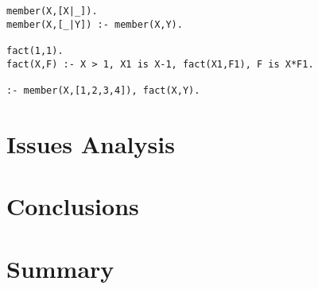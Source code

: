 
\begin{verbatim}
member(X,[X|_]).
member(X,[_|Y]) :- member(X,Y).

fact(1,1).
fact(X,F) :- X > 1, X1 is X-1, fact(X1,F1), F is X*F1.

:- member(X,[1,2,3,4]), fact(X,Y).
\end{verbatim}

\section{Issues Analysis}

\section{Conclusions}

\section{Summary}
